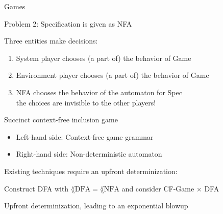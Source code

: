 \documentclass[../talk.tex]{subfiles}
\begin{document}
\begin{frame}{Games}
\begin{overlayarea}{\slidewidth}{\slideheight}
        {%
            Problem 2: Specification is given as NFA

            \vspace*{1em}


            {%
                Three entities make decisions:
                \begin{enumerate}[1)]
                    \item System player chooses (a part of) the behavior of Game
                    \item Environment player chooses (a part of) the behavior of Game
                    \item NFA chooses the behavior of the automaton for Spec
                        \\
                        \quad the choices are \alert{invisible} to the other players!
                \end{enumerate}
            }
        }
        {%
            \alert{Succinct context-free inclusion game}

            \begin{itemize}
                \item[] Left-hand side: Context-free game grammar

                \item[] Right-hand side: Non-deterministic automaton
            \end{itemize}

            \vspace*{1em}

            {%
                Existing techniques require an \alert{upfront determinization}:

                \vspace*{1em}

                Construct \alert{DFA} with $\lang{\text{DFA}} = \lang{\text{NFA}}$ and consider CF-Game $\times$ DFA

                \vspace*{1em}

                Upfront determinization, leading to an \alert{exponential blowup}
            }
        }
    \end{overlayarea}
\end{frame}
\end{document}

